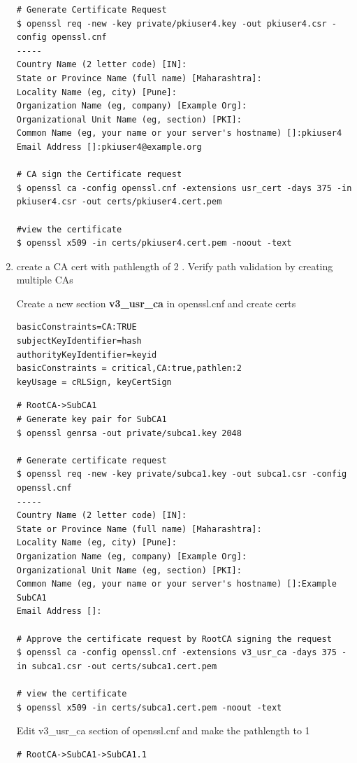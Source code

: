 \documentclass[12pt]{report}
\begin{document}
\begin{enumerate}[label*=\arabic*.]
\begin{lstlisting}[style=bashInputStyle]
# Generate Certificate Request
$ openssl req -new -key private/pkiuser4.key -out pkiuser4.csr -config openssl.cnf
-----
Country Name (2 letter code) [IN]:
State or Province Name (full name) [Maharashtra]:
Locality Name (eg, city) [Pune]:
Organization Name (eg, company) [Example Org]:
Organizational Unit Name (eg, section) [PKI]:
Common Name (eg, your name or your server's hostname) []:pkiuser4
Email Address []:pkiuser4@example.org

# CA sign the Certificate request 
$ openssl ca -config openssl.cnf -extensions usr_cert -days 375 -in pkiuser4.csr -out certs/pkiuser4.cert.pem

#view the certificate
$ openssl x509 -in certs/pkiuser4.cert.pem -noout -text
        \end{lstlisting}

    \item create a CA cert with pathlength of 2 . Verify path validation by creating multiple CAs

        Create a new section \textbf{v3\_usr\_ca} in openssl.cnf and create certs
        \begin{lstlisting}
basicConstraints=CA:TRUE        
subjectKeyIdentifier=hash
authorityKeyIdentifier=keyid
basicConstraints = critical,CA:true,pathlen:2
keyUsage = cRLSign, keyCertSign
        \end{lstlisting}
        \begin{lstlisting}[style=bashInputStyle]
# RootCA->SubCA1
# Generate key pair for SubCA1 
$ openssl genrsa -out private/subca1.key 2048

# Generate certificate request
$ openssl req -new -key private/subca1.key -out subca1.csr -config openssl.cnf
-----
Country Name (2 letter code) [IN]:
State or Province Name (full name) [Maharashtra]:
Locality Name (eg, city) [Pune]:
Organization Name (eg, company) [Example Org]:
Organizational Unit Name (eg, section) [PKI]:
Common Name (eg, your name or your server's hostname) []:Example SubCA1
Email Address []:

# Approve the certificate request by RootCA signing the request
$ openssl ca -config openssl.cnf -extensions v3_usr_ca -days 375 -in subca1.csr -out certs/subca1.cert.pem
    
# view the certificate
$ openssl x509 -in certs/subca1.cert.pem -noout -text
        \end{lstlisting}
        Edit v3\_usr\_ca section of openssl.cnf and make the pathlength to 1 
        \begin{lstlisting}[style=bashInputStyle]
# RootCA->SubCA1->SubCA1.1


\end{lstlisting}
\end{enumerate}
\end{document}
